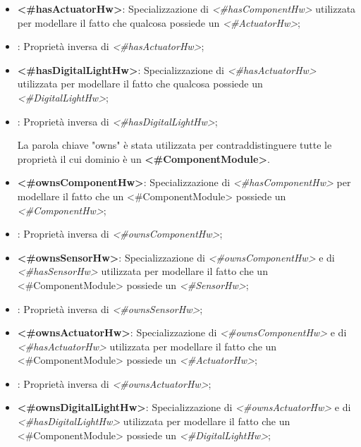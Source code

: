 \begin{itemize}
	\item \textbf{<\#hasActuatorHw>}: Specializzazione di \textit{<\#hasComponentHw>} utilizzata per modellare il fatto che qualcosa possiede un \textit{<\#ActuatorHw>};

	\item {}: Proprietà inversa di \textit{<\#hasActuatorHw>};

	\item \textbf{<\#hasDigitalLightHw>}: Specializzazione di \textit{<\#hasActuatorHw>} utilizzata per modellare il fatto che qualcosa possiede un \textit{<\#DigitalLightHw>};

	\item {}: Proprietà inversa di \textit{<\#hasDigitalLightHw>};

\begin{info}[owns:]
	La parola chiave "owns" è stata utilizzata per contraddistinguere tutte le proprietà il cui dominio è un \textbf{<\#ComponentModule>}.
\end{info}

	\item \textbf{<\#ownsComponentHw>}: Specializzazione di \textit{<\#hasComponentHw>} per modellare il fatto che un <#ComponentModule> possiede un \textit{<\#ComponentHw>};

	\item {}: Proprietà inversa di \textit{<\#ownsComponentHw>};

	\item \textbf{<\#ownsSensorHw>}: Specializzazione di \textit{<\#ownsComponentHw>} e di \textit{<\#hasSensorHw>} utilizzata per modellare il fatto che un <#ComponentModule> possiede un \textit{<\#SensorHw>};

	\item {}: Proprietà inversa di \textit{<\#ownsSensorHw>};

	\item \textbf{<\#ownsActuatorHw>}: Specializzazione di \textit{<\#ownsComponentHw>} e di \textit{<\#hasActuatorHw>} utilizzata per modellare il fatto che un <#ComponentModule> possiede un \textit{<\#ActuatorHw>};

	\item {}: Proprietà inversa di \textit{<\#ownsActuatorHw>};

	\item \textbf{<\#ownsDigitalLightHw>}: Specializzazione di \textit{<\#ownsActuatorHw>} e di \textit{<\#hasDigitalLightHw>} utilizzata per modellare il fatto che un <#ComponentModule> possiede un \textit{<\#DigitalLightHw>};


\end{itemize}
